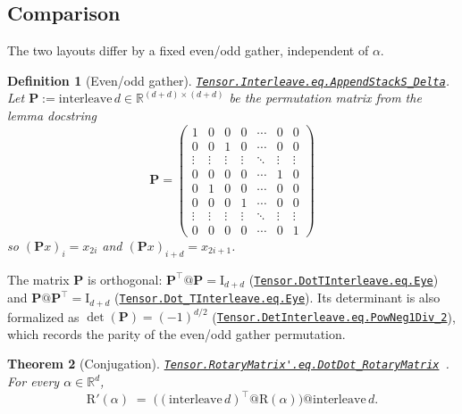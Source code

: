 \documentclass[11pt,a4paper]{article}
\newcommand{\lmod}[1]{\href{http://www.lemma.cn/lean/?module=#1}{\nolinkurl{#1}}}
\newtheorem{theorem}{Theorem}[section]
\newtheorem{definition}[theorem]{Definition}
\newcommand{\R}{\mathbb{R}}
\newcommand{\rot}{\mathrm{R}}
\newcommand{\eye}{\mathrm{I}}
\begin{document}
\subsection{Comparison}
\label{sec:compare}

The two layouts differ by a fixed even/odd gather, independent of \(\alpha\).

\begin{definition}[Even/odd gather]
\label{def:P}
\lmod{Tensor.Interleave.eq.AppendStackS_Delta}.
Let \(\boldsymbol{P}:=\mathrm{interleave}\,d\in\R^{(d+d)\times(d+d)}\) be the permutation matrix from the lemma docstring
\begin{equation}
\label{eq:P}
{\boldsymbol{P}}=\begin{pmatrix}
1 & 0 & 0 & 0 & \cdots & 0 & 0 \\
0 & 0 & 1 & 0 & \cdots & 0 & 0 \\
\vdots & \vdots & \vdots & \vdots & \ddots & \vdots & \vdots \\
0 & 0 & 0 & 0 & \cdots & 1 & 0 \\
0 & 1 & 0 & 0 & \cdots & 0 & 0 \\
0 & 0 & 0 & 1 & \cdots & 0 & 0 \\
\vdots & \vdots & \vdots & \vdots & \ddots & \vdots & \vdots \\
0 & 0 & 0 & 0 & \cdots & 0 & 1
\end{pmatrix}
\end{equation}
so \((\boldsymbol{P}x)_i=x_{2i}\) and \((\boldsymbol{P}x)_{i+d}=x_{2i+1}\).
\end{definition}

The matrix \(\boldsymbol{P}\) is orthogonal:
\(\boldsymbol{P}^\top@\boldsymbol{P}=\eye_{d+d}\)
(\lmod{Tensor.DotTInterleave.eq.Eye})
and
\(\boldsymbol{P}@\boldsymbol{P}^\top=\eye_{d+d}\)
(\lmod{Tensor.Dot_TInterleave.eq.Eye}).
Its determinant is also formalized as
\(\det(\boldsymbol{P})=(-1)^{d/2}\)
(\lmod{Tensor.DetInterleave.eq.PowNeg1Div_2}),
which records the parity of the even/odd gather permutation.

\begin{theorem}[Conjugation]
\label{thm:conj}
\lmod{Tensor.RotaryMatrix'.eq.DotDot_RotaryMatrix}~\cite{lemma_rope_conj}.
For every \(\alpha\in\R^d\),
\begin{equation}
  \label{eq:conj}
  \rot'(\alpha)
  \;=\;
  \bigl((\mathrm{interleave}\,d)^\top @ \rot(\alpha)\bigr) @ \mathrm{interleave}\,d.
\end{equation}
\end{theorem}
\end{document}
